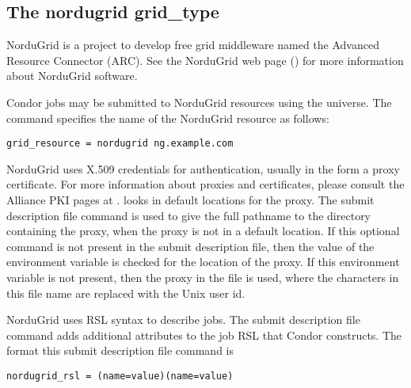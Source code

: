 
\subsection{\label{sec:NorduGrid}The nordugrid grid\_type }

NorduGrid is a project to develop free grid middleware named
the Advanced  Resource Connector (ARC).
See the NorduGrid web page ()
for more information about NorduGrid software.

Condor jobs may be submitted to
NorduGrid resources using the  universe.
The  command specifies the name of the
NorduGrid resource as follows:
\begin{verbatim}
grid_resource = nordugrid ng.example.com
\end{verbatim}

NorduGrid uses X.509 credentials for authentication,
usually in the form a proxy certificate. 
For more information about proxies and certificates,
please consult the Alliance PKI pages at
.
 looks in default locations for the proxy. 
The submit description file command 
is used to give the full pathname to the directory containing the proxy,
when the proxy is not in a default location.
If this optional command is not present in the submit description file,
then the value of the environment variable
 is checked for the location of the proxy.
If this environment variable is not present, then 
the proxy in the file
 is used,
where the characters \verb@XXXX@ in this file name are
replaced with the Unix user id.

NorduGrid uses RSL syntax to describe jobs.
The submit description file command
adds additional attributes to the job RSL that Condor
constructs. 
The format this submit description file command is
\begin{verbatim}
nordugrid_rsl = (name=value)(name=value)
\end{verbatim}
